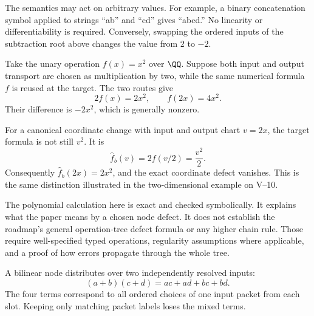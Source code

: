 The semantics may act on arbitrary values. For example, a binary concatenation symbol applied to strings ``ab'' and ``cd'' gives ``abcd.'' No linearity or differentiability is required. Conversely, swapping the ordered inputs of the subtraction root above changes the value from $2$ to $-2$.


Take the unary operation $f(x)=x^2$ over $\QQ$. Suppose both input and output transport are chosen as multiplication by two, while the same numerical formula $f$ is reused at the target. The two routes give
\[
2f(x)=2x^2,\qquad f(2x)=4x^2.
\]
Their difference is $-2x^2$, which is generally nonzero.


For a canonical coordinate change with input and output chart $v=2x$, the target formula is not still $v^2$. It is
\[
\widehat f_b(v)=2f(v/2)=\frac{v^2}{2}.
\]
Consequently $\widehat f_b(2x)=2x^2$, and the exact coordinate defect vanishes. This is the same distinction illustrated in the two-dimensional example on V--10.

The polynomial calculation here is exact and checked symbolically. It explains what the paper means by a chosen node defect. It does not establish the roadmap's general operation-tree defect formula or any higher chain rule. Those require well-specified typed operations, regularity assumptions where applicable, and a proof of how errors propagate through the whole tree.


A bilinear node distributes over two independently resolved inputs:
\[
(a+b)(c+d)=ac+ad+bc+bd.
\]
The four terms correspond to all ordered choices of one input packet from each slot. Keeping only matching packet labels loses the mixed terms.

